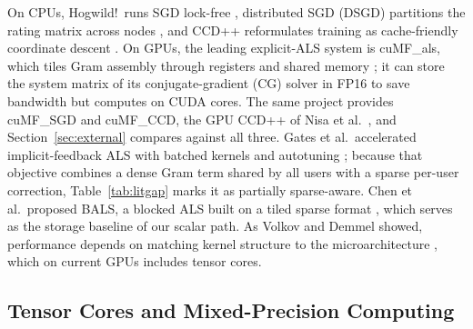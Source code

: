 On CPUs, Hogwild!\ runs SGD lock-free \cite{recht2011hogwild}, distributed SGD (DSGD) partitions the rating matrix across nodes \cite{gemulla2011large}, and CCD++ reformulates training as cache-friendly coordinate descent \cite{yu2012scalable}. On GPUs, the leading explicit-ALS system is cuMF\_als, which tiles Gram assembly through registers and shared memory \cite{tan2016faster}; it can store the system matrix of its conjugate-gradient (CG) solver in FP16 to save bandwidth but computes on CUDA cores. The same project provides cuMF\_SGD \cite{xie2017cumf} and cuMF\_CCD, the GPU CCD++ of Nisa et al.\ \cite{nisa2017parallel}, and Section~\ref{sec:external} compares against all three. Gates et al.\ accelerated implicit-feedback ALS with batched kernels and autotuning \cite{gates2015accelerating}; because that objective combines a dense Gram term shared by all users with a sparse per-user correction, Table~\ref{tab:litgap} marks it as partially sparse-aware. Chen et al.\ proposed BALS, a blocked ALS built on a tiled sparse format \cite{chen2021bals}, which serves as the storage baseline of our scalar path. As Volkov and Demmel showed, performance depends on matching kernel structure to the microarchitecture \cite{volkov2008benchmarking}, which on current GPUs includes tensor cores.

\subsection{Tensor Cores and Mixed-Precision Computing}


